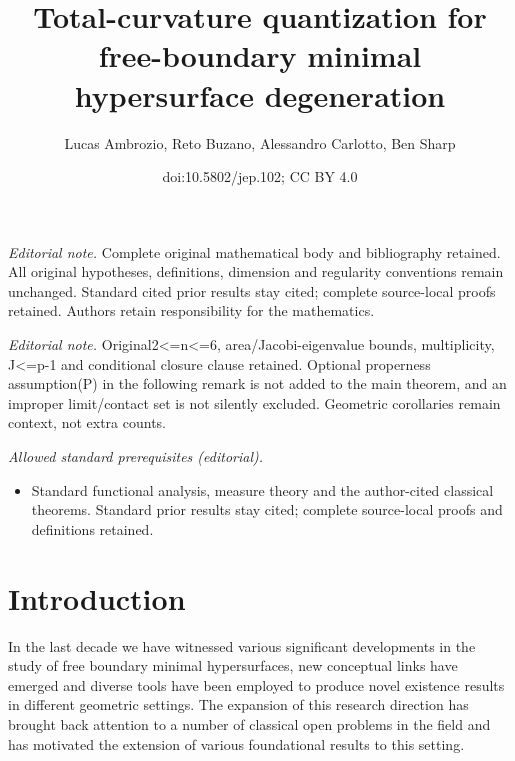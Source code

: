 \documentclass[10pt]{amsart}
\title{Total-curvature quantization for free-boundary minimal hypersurface degeneration}
\author{Lucas Ambrozio, Reto Buzano, Alessandro Carlotto, Ben Sharp}
\date{doi:10.5802/jep.102; CC BY 4.0}
\theoremstyle{definition}
\providecommand{\mainmatter}{}\providecommand{\backmatter}{}
\begin{document}
\maketitle
\noindent\textit{Editorial note.} Complete original mathematical body and bibliography retained. All original hypotheses, definitions, dimension and regularity conventions remain unchanged. Standard cited prior results stay cited; complete source-local proofs retained. Authors retain responsibility for the mathematics.\par\medskip
\noindent\textit{Editorial note.} Original2<=n<=6, area/Jacobi-eigenvalue bounds, multiplicity, J<=p-1 and conditional closure clause retained. Optional properness assumption(P) in the following remark is not added to the main theorem, and an improper limit/contact set is not silently excluded. Geometric corollaries remain context, not extra counts.\par\medskip
\noindent\textit{Allowed standard prerequisites (editorial).}\begin{itemize}
\item Standard functional analysis, measure theory and the author-cited classical theorems. Standard prior results stay cited; complete source-local proofs and definitions retained.
\end{itemize}\medskip
\newpage
\tableofcontents
\mainmatter

\section{Introduction}\label{sec:intro}

In the last decade we have witnessed various significant developments in the study of free boundary minimal hypersurfaces, new conceptual links have emerged and diverse tools have been employed to produce novel existence results in different geometric settings. The expansion of this research direction has brought back attention to a number of classical open problems in the field and has motivated the extension of various foundational results to this setting.
\end{document}
